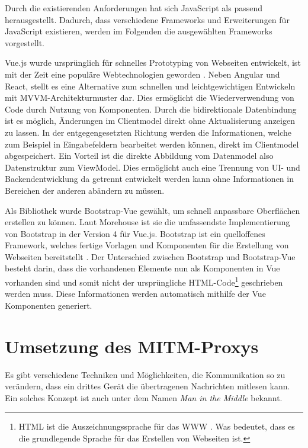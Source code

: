     Durch die existierenden Anforderungen hat sich JavaScript als passend herausgestellt. Dadurch, dass verschiedene Frameworks und Erweiterungen für JavaScript existieren, werden im Folgenden die ausgewählten Frameworks vorgestellt.
    
    Vue.js wurde ursprünglich für schnelles Prototyping von Webseiten entwickelt, ist mit der Zeit eine populäre Webtechnologien geworden \cite{you2018vue,stack_overflow_2019}. Neben Angular und React, stellt es eine Alternative zum schnellen und leichtgewichtigen Entwickeln mit \ac{MVVM}-Architekturmuster dar. Dies ermöglicht die Wiederverwendung von Code durch Nutzung von Komponenten. Durch die bidirektionale Datenbindung ist es möglich, Änderungen im Clientmodel direkt ohne Aktualisierung anzeigen zu lassen. In der entgegengesetzten Richtung werden die Informationen, welche zum Beispiel in Eingabefeldern bearbeitet werden können, direkt im Clientmodel abgespeichert. Ein Vorteil ist die direkte Abbildung vom Datenmodel also Datenstruktur zum ViewModel. Dies ermöglicht auch eine Trennung von UI- und Backendentwicklung da getrennt entwickelt werden kann ohne Informationen in Bereichen der anderen abändern zu müssen. \cite{filipova_2016}
    
    Als Bibliothek wurde Bootstrap-Vue gewählt, um schnell anpassbare Oberflächen erstellen zu können.
    Laut Morehouse \cite{morehouse_2019} ist sie die umfassendste Implementierung von Bootstrap in der Version 4 für Vue.js.
    Bootstrap ist ein quelloffenes Framework, welches fertige Vorlagen und Komponenten für die Erstellung von Webseiten bereitstellt \cite{otto_thornton_2019}. Der Unterschied zwischen Bootstrap und Bootstrap-Vue besteht darin, dass die vorhandenen Elemente nun als Komponenten in Vue vorhanden sind und somit nicht der ursprüngliche \ac{HTML}-Code\footnote{\ac{HTML} ist die Auszeichnungssprache für das \ac{WWW} \cite{w3c_2017}. Was bedeutet, dass es die grundlegende Sprache für das Erstellen von Webseiten ist.} geschrieben werden muss. Diese Informationen werden automatisch mithilfe der Vue Komponenten generiert.
        
\section{Umsetzung des MITM-Proxys}
    Es gibt verschiedene Techniken und Möglichkeiten, die Kommunikation so zu verändern, dass ein drittes Gerät die übertragenen Nachrichten mitlesen kann. Ein solches Konzept ist auch unter dem Namen \emph{Man in the Middle} bekannt.
    

